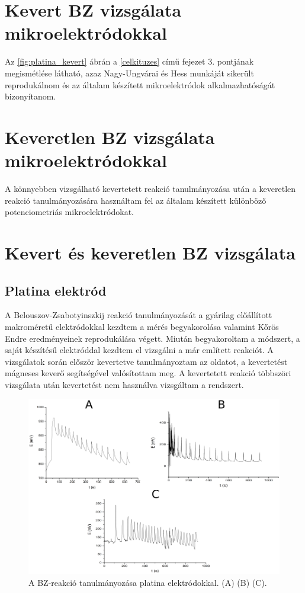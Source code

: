 \section{Kevert BZ vizsgálata mikroelektródokkal}

Az \ref{fig:platina_kevert} ábrán a \ref{celkituzes} című fejezet 3. pontjának megismétlése látható, azaz Nagy-Ungvárai és Hess munkáját sikerült reprodukálnom és az általam készített mikroelektródok alkalmazhatóságát bizonyítanom.

\section{Keveretlen BZ vizsgálata mikroelektródokkal}
A könnyebben vizsgálható kevertetett reakció tanulmányozása után a keveretlen reakció tanulmányozására használtam fel az általam készített különböző potenciometriás mikroelektródokat.

\section{Kevert és keveretlen BZ vizsgálata}
\subsection{Platina elektród}
A Belouszov-Zsabotyinszkij reakció tanulmányozását a gyárilag előállított makroméretű elektródokkal kezdtem a mérés begyakorolása valamint Kőrös Endre eredményeinek \cite{noyes1972oscillations} reprodukálása végett. Miután begyakoroltam a módszert, a saját készítésű elektróddal kezdtem el vizsgálni a már említett reakciót. A vizsgálatok során először kevertetve tanulmányoztam az oldatot, a kevertetést mágneses keverő segítségével valósítottam meg. A kevertetett reakció többszöri vizsgálata után kevertetést nem használva vizsgáltam a rendszert.

\begin{figure}[h]
\centering
\includegraphics[width=1\textwidth]{img/platina_meres.png}
\caption{A BZ-reakció tanulmányozása platina elektródokkal. (A) (B) (C).}
\label{fig:platina_meres}
\end{figure}

